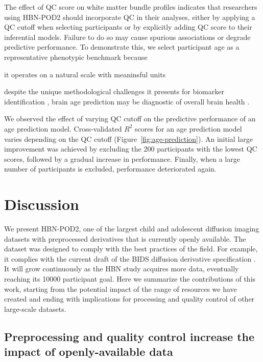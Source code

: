 \documentclass[9pt,lineno]{elife}
\begin{document}
The effect of QC score on white matter bundle profiles indicates that researchers
using HBN-POD2 should incorporate QC in their analyses, either by applying a QC cutoff
when selecting participants or by explicitly adding QC score to their inferential
models. Failure to do so may cause spurious associations or degrade predictive
performance. To demonstrate this, we select participant age as a representative phenotypic benchmark because
\begin{enumerate*}[%
    label=(\roman*),%
    before=\unskip{ },%
    itemjoin={{, }},%
    itemjoin*={{ and }}]
    \item it operates on a natural scale with meaninsful units
    \item despite the unique methodological challenges it presents for biomarker identification \cite{nelson2020biomarkers}, brain age prediction may be diagnostic of overall brain health \citep{franke2010estimating, cole2019brain, richie-halford2021multidimensional}.
\end{enumerate*}
We observed the effect of varying QC cutoff on the predictive performance of an age
prediction model. Cross-validated $R^2$ scores for an age prediction model
varies depending on the QC cutoff (Figure~\ref{fig:age-prediction}). An initial large improvement was achieved by excluding the 200 participants with the lowest QC scores, followed by a gradual increase in performance. Finally, when a large number of participants is excluded, performance deteriorated again.

\section{Discussion}

We present HBN-POD2, one of the largest child and adolescent diffusion imaging
datasets with preprocessed derivatives that is currently openly available. The dataset
was designed to comply with the best practices of the field. For example, it
complies with the current draft of the BIDS diffusion derivative specification
\citep{Pestilli2021}. It will grow continuously as the HBN study acquires more
data, eventually reaching its \num{10000} participant goal. Here we summarize the
contributions of this work, starting from the potential impact of the range of
resources we have created and ending with implications for processing and
quality control of other large-scale datasets.

\subsection{Preprocessing and quality control increase the impact of openly-available data}
\end{document}
